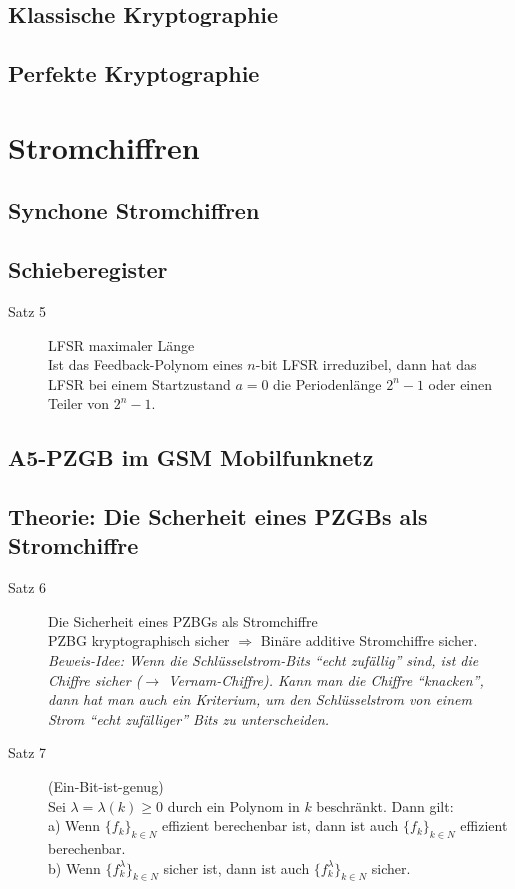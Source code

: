 \documentclass[10pt,a4paper]{article}
\begin{document}
\subsection{Klassische Kryptographie}
\subsection{Perfekte Kryptographie}
\section{Stromchiffren}
\subsection{Synchone Stromchiffren}
\subsection{Schieberegister}
\begin{description}
	\item[Satz 5] LFSR maximaler Länge\\
Ist das Feedback-Polynom eines $n$-bit LFSR irreduzibel, dann hat das LFSR bei einem Startzustand $a = 0$ die Periodenlänge $2^n-1$ oder einen Teiler von $2^n-1$.
\end{description}
\subsection{A5-PZGB im GSM Mobilfunknetz}
\subsection{Theorie: Die Scherheit eines PZGBs als Stromchiffre}
\begin{description}
	\item[Satz 6] Die Sicherheit eines PZBGs als Stromchiffre\\
PZBG kryptographisch sicher $\Rightarrow$ Binäre additive Stromchiffre sicher.\\
\textit{Beweis-Idee:
Wenn die Schlüsselstrom-Bits “echt zufällig” sind, ist die Chiffre sicher ($\to$ Vernam-Chiffre). Kann man die Chiffre “knacken”, dann hat man auch ein Kriterium, um den Schlüsselstrom von einem Strom “echt zufälliger” Bits zu unterscheiden.}
	\item[Satz 7] (Ein-Bit-ist-genug)\\
Sei $\lambda = \lambda(k) \geq 0$ durch ein Polynom in $k$ beschränkt. Dann gilt:\\
a) Wenn $\{f_k \}_{k\in N}$ effizient berechenbar ist, dann ist auch $\{f_k \}_{k\in N}$ effizient berechenbar.\\
b) Wenn $\{f_k^\lambda \}_{k\in N}$ sicher ist, dann ist auch $\{f_k^\lambda \}_{k\in N}$ sicher.
\end{description}
\end{document}
